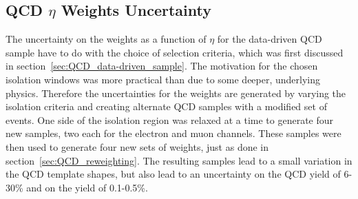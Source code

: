 \subsection{QCD \texorpdfstring{$\eta$}{eta} Weights Uncertainty}

The uncertainty on the weights as a function of $\eta$ for the data-driven QCD sample have to do with the choice of selection criteria, which was first discussed in section~\ref{sec:QCD_data-driven_sample}.
The motivation for the chosen isolation windows was more practical than due to some deeper, underlying physics.
Therefore the uncertainties for the weights are generated by varying the isolation criteria and creating alternate QCD samples with a modified set of events.
One side of the isolation region was relaxed at a time to generate four new samples, two each for the electron and muon channels.
These samples were then used to generate four new sets of weights, just as done in section~\ref{sec:QCD_reweighting}.
The resulting samples lead to a small variation in the QCD template shapes, but also lead to an uncertainty on the QCD yield of 6-30\% and on the \Wjets yield of 0.1-0.5\%.
